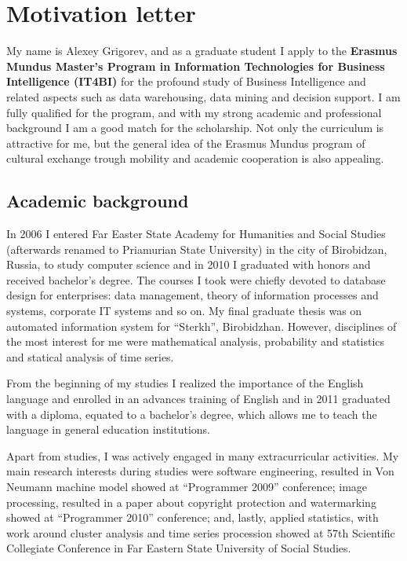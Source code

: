 \documentclass[a4paper,12pt]{article}
\begin{document}
\section*{Motivation letter}

My name is Alexey Grigorev, and as a graduate student I apply to the \textbf{Erasmus Mundus Master's Program in Information Technologies for Business Intelligence (IT4BI)} for the profound study of Business Intelligence and related aspects such as data warehousing, data mining and decision support. I am fully qualified for the program, and with my strong academic and professional background I am a good match for the scholarship. Not only the curriculum is attractive for me, but the general idea of the Erasmus Mundus program of cultural exchange trough mobility and academic cooperation is also appealing.

\subsection*{Academic background}

In 2006 I entered Far Easter State Academy for Humanities and Social Studies (afterwards renamed to Priamurian State University) in the city of Birobidzan, Russia, to study computer science and in 2010 I graduated with honors and received bachelor's degree. The courses I took were chiefly devoted to database design for enterprises: data management, theory of information processes and systems, corporate IT systems and so on. My final graduate thesis was on automated information system for ``Sterkh'', Birobidzhan. However, disciplines of the most interest for me were mathematical analysis, probability and statistics and statical analysis of time series.

From the beginning of my studies I realized the importance of the English language and enrolled in an advances training of English and in 2011 graduated with a diploma, equated to a bachelor's degree, which allows me to teach the language in general education institutions.

Apart from studies, I was actively engaged in many extracurricular activities. My main research interests during studies were software engineering, resulted in Von Neumann machine model showed at ``Programmer 2009'' conference; image processing, resulted in a paper about copyright protection and watermarking showed at ``Programmer 2010'' conference; and, lastly, applied statistics, with work around cluster analysis and time series procession showed at 57th Scientific Collegiate Conference in Far Eastern State University of Social Studies.
\end{document}
